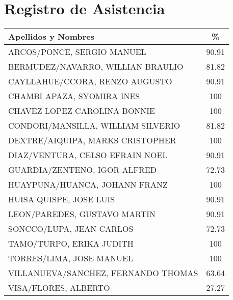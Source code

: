 \chapter{Registro de Asistencia}
\newpage

\begin{table}[]
	\centering
	\begin{tabular}{lc}
		\hline
		\textbf{Apellidos y Nombres }                & \textbf{\%} \\ \hline
		ARCOS/PONCE, SERGIO MANUEL          & 90.91                  \\
		BERMUDEZ/NAVARRO, WILLIAN BRAULIO   & 81.82                  \\
		CAYLLAHUE/CCORA, RENZO AUGUSTO      & 90.91                  \\
		CHAMBI APAZA, SYOMIRA INES          & 100                    \\
		CHAVEZ LOPEZ CAROLINA BONNIE        & 100                    \\
		CONDORI/MANSILLA, WILLIAM SILVERIO  & 81.82                  \\
		DEXTRE/AIQUIPA, MARKS CRISTOPHER    & 100                    \\
		DIAZ/VENTURA, CELSO EFRAIN NOEL     & 90.91                  \\
		GUARDIA/ZENTENO, IGOR ALFRED        & 72.73                  \\
		HUAYPUNA/HUANCA, JOHANN FRANZ       & 100                    \\
		HUISA QUISPE, JOSE LUIS             & 90.91                  \\
		LEON/PAREDES, GUSTAVO MARTIN        & 90.91                  \\
		SONCCO/LUPA, JEAN CARLOS            & 72.73                  \\
		TAMO/TURPO, ERIKA JUDITH            & 100                    \\
		TORRES/LIMA, JOSE MANUEL            & 100                    \\
		VILLANUEVA/SANCHEZ, FERNANDO THOMAS & 63.64                  \\
		VISA/FLORES, ALBERTO                & 27.27      \\ \hline           
	\end{tabular}
\end{table}